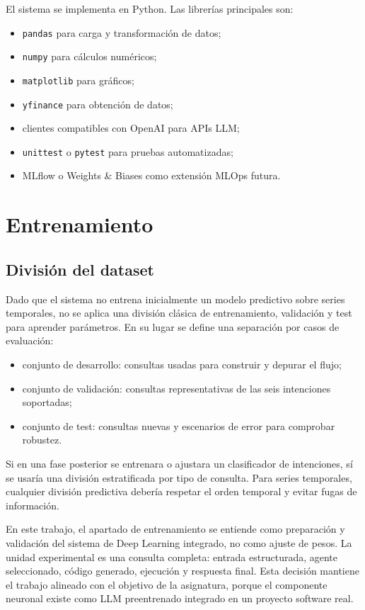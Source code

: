 \documentclass[11pt,a4paper]{article}
\let\oldsection\section
\renewcommand{\section}{\clearpage\oldsection}
\begin{document}
El sistema se implementa en Python. Las librer\'ias principales son:

\begin{itemize}
    \item \texttt{pandas} para carga y transformaci\'on de datos;
    \item \texttt{numpy} para c\'alculos num\'ericos;
    \item \texttt{matplotlib} para gr\'aficos;
    \item \texttt{yfinance} para obtenci\'on de datos;
    \item clientes compatibles con OpenAI para APIs LLM;
    \item \texttt{unittest} o \texttt{pytest} para pruebas automatizadas;
    \item MLflow o Weights \& Biases como extensi\'on MLOps futura.
\end{itemize}

\section{Entrenamiento}

\subsection{Divisi\'on del dataset}

Dado que el sistema no entrena inicialmente un modelo predictivo sobre series temporales, no se aplica una divisi\'on cl\'asica de entrenamiento, validaci\'on y test para aprender par\'ametros. En su lugar se define una separaci\'on por casos de evaluaci\'on:

\begin{itemize}
    \item conjunto de desarrollo: consultas usadas para construir y depurar el flujo;
    \item conjunto de validaci\'on: consultas representativas de las seis intenciones soportadas;
    \item conjunto de test: consultas nuevas y escenarios de error para comprobar robustez.
\end{itemize}

Si en una fase posterior se entrenara o ajustara un clasificador de intenciones, s\'i se usar\'ia una divisi\'on estratificada por tipo de consulta. Para series temporales, cualquier divisi\'on predictiva deber\'ia respetar el orden temporal y evitar fugas de informaci\'on.

En este trabajo, el apartado de entrenamiento se entiende como preparaci\'on y validaci\'on del sistema de Deep Learning integrado, no como ajuste de pesos. La unidad experimental es una consulta completa: entrada estructurada, agente seleccionado, c\'odigo generado, ejecuci\'on y respuesta final. Esta decisi\'on mantiene el trabajo alineado con el objetivo de la asignatura, porque el componente neuronal existe como LLM preentrenado integrado en un proyecto software real.
\end{document}
